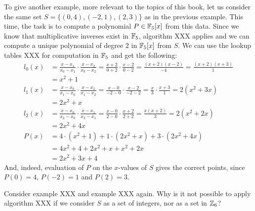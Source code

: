 \begin{example} To give another example, more relevant to the topics of this book, let us consider the same set $S=\{(0,4),(-2,1),(2,3)\}$ as in the previous example. This time, the task is to compute a polynomial $P\in\mathbb{F}_5[x]$ from this data. Since we know
that multiplicative inverses exist in $\mathbb{F}_5$, algorithm XXX applies and we can compute a unique polynomial of degree 2 in $\mathbb{F}_5[x]$ from $S$. We can use the lookup tables XXX for computation in $\mathbb{F}_5$ and get the following:
\begin{align*}
l_0(x) & = \frac{x-x_1}{x_0-x_1}\cdot\frac{x-x_2}{x_0-x_2}
         = \frac{x+2}{0+2}\cdot\frac{x-2}{0-2}
         =  \frac{(x+2)(x-2)}{-4}
         =  \frac{(x+2)(x+3)}{1}\\
       & =  x^2+1\\
l_1(x) & =  \frac{x-x_0}{x_1-x_0}\cdot\frac{x-x_2}{x_1-x_2}
         = \frac{x-0}{-2-0}\cdot \frac{x-2}{-2-2}
         = \frac{x}{3}\cdot \frac{x+3}{1}
         = 2(x^2+3x)\\
       & =  2x^2+x\\
l_2(x) & = \frac{x-x_0}{x_2-x_0}\cdot\frac{x-x_1}{x_2-x_1}
         = \frac{x-0}{2-0}\cdot\frac{x+2}{2+2}
         = \frac{x(x+2)}{3}
         = 2(x^2+2x)\\
       & = 2x^2+4x\\
P(x)   & = 4\cdot (x^2+1) + 1\cdot (2x^2+x) + 3\cdot (2x^2+4x) \\
       & = 4x^2+4 + 2x^2 +x + x^2+2x\\
       & = 2x^2 +3x +4       
\end{align*}
And, indeed, evaluation of $P$ on the $x$-values of $S$ gives the correct points, since $P(0)=4$, $P(-2)=1$ and $P(2)=3$.
\end{example}

\begin{exercise}
Consider example XXX and example XXX again. Why is it not possible to apply algorithm XXX if we consider $S$ as a set of integers, nor as a set in $\mathbb{Z}_6$?
\end{exercise}



